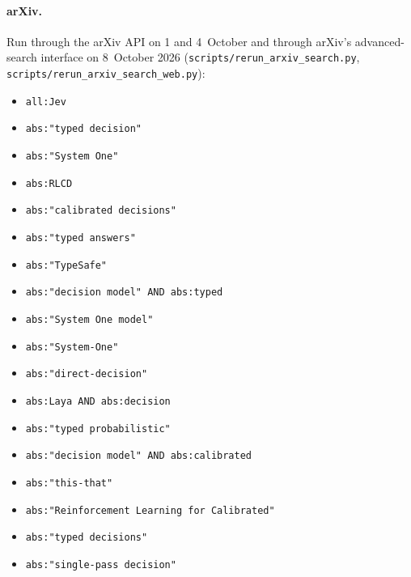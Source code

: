 \paragraph{arXiv.}
Run through the arXiv API on 1 and 4~October and through arXiv's advanced-search interface on 8~October 2026 (\nolinkurl{scripts/rerun_arxiv_search.py}, \nolinkurl{scripts/rerun_arxiv_search_web.py}):
\begin{itemize}[nosep,leftmargin=1.5em]
  \item \nolinkurl{all:Jev}
  \item \nolinkurl{abs:"typed decision"}
  \item \nolinkurl{abs:"System One"}
  \item \nolinkurl{abs:RLCD}
  \item \nolinkurl{abs:"calibrated decisions"}
  \item \nolinkurl{abs:"typed answers"}
  \item \nolinkurl{abs:"TypeSafe"}
  \item \nolinkurl{abs:"decision model" AND abs:typed}
  \item \nolinkurl{abs:"System One model"}
  \item \nolinkurl{abs:"System-One"}
  \item \nolinkurl{abs:"direct-decision"}
  \item \nolinkurl{abs:Laya AND abs:decision}
  \item \nolinkurl{abs:"typed probabilistic"}
  \item \nolinkurl{abs:"decision model" AND abs:calibrated}
  \item \nolinkurl{abs:"this-that"}
  \item \nolinkurl{abs:"Reinforcement Learning for Calibrated"}
  \item \nolinkurl{abs:"typed decisions"}
  \item \nolinkurl{abs:"single-pass decision"}
\end{itemize}

